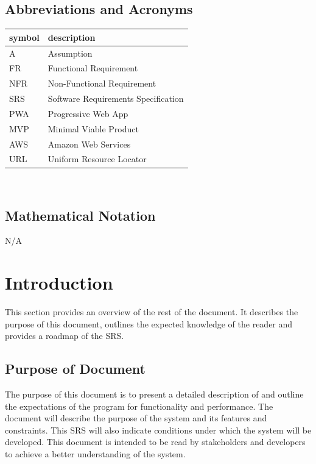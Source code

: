 \documentclass[12pt]{article}
\begin{document}
\subsection{Abbreviations and Acronyms}

\renewcommand{\arraystretch}{1.2}
\begin{tabular}{l l} 
  \toprule		
  \textbf{symbol} & \textbf{description}\\
  \midrule 
  A & Assumption\\
  FR & Functional Requirement\\
  NFR & Non-Functional Requirement\\
  SRS & Software Requirements Specification\\
  PWA & Progressive Web App\\
  MVP & Minimal Viable Product\\
  AWS & Amazon Web Services\\
  URL & Uniform Resource Locator\\
  \bottomrule
\end{tabular}\\
\subsection{Mathematical Notation}

N/A

\newpage


\section{Introduction}

This section provides an overview of the rest of the document. It describes the purpose of this document, outlines the expected knowledge of the reader and provides a roadmap of the SRS.

\subsection{Purpose of Document}

  The purpose of this document is to present a detailed description of \progname{} and outline the expectations of the program for functionality and performance. The document will describe the purpose of the system and its features and constraints. This SRS will also indicate conditions under which the system will be developed. This document is intended to be read by stakeholders and developers to achieve a better understanding of the system.
\end{document}
